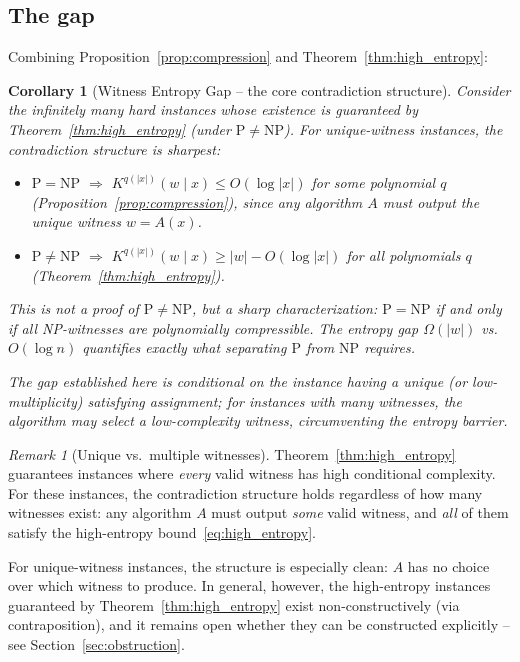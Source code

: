 \documentclass[aps,prd,twocolumn,superscriptaddress,nofootinbib]{revtex4-2}
\newtheorem{corollary}[theorem]{Corollary}
\theoremstyle{definition}
\theoremstyle{remark}
\newtheorem{remark}[theorem]{Remark}
\newcommand{\NP}{\mathrm{NP}}
\newcommand{\PP}{\mathrm{P}}
\begin{document}
\subsection{The gap}

Combining Proposition~\ref{prop:compression} and Theorem~\ref{thm:high_entropy}:

\begin{corollary}[Witness Entropy Gap -- the core contradiction structure]
\label{cor:gap}
Consider the infinitely many hard instances whose existence is guaranteed by Theorem~\ref{thm:high_entropy} (under $\PP \neq \NP$). For unique-witness instances, the contradiction structure is sharpest:
\begin{itemize}
\item $\PP = \NP$ $\Rightarrow$ $K^{q(|x|)}(w \mid x) \leq O(\log |x|)$ for some polynomial $q$ (Proposition~\ref{prop:compression}), since any algorithm $A$ must output the unique witness $w = A(x)$.
\item $\PP \neq \NP$ $\Rightarrow$ $K^{q(|x|)}(w \mid x) \geq |w| - O(\log |x|)$ for all polynomials $q$ (Theorem~\ref{thm:high_entropy}).
\end{itemize}
This is not a proof of $\PP \neq \NP$, but a sharp characterization: $\PP = \NP$ if and only if all NP-witnesses are polynomially compressible. The entropy gap $\Omega(|w|)$ vs.\ $O(\log n)$ quantifies exactly what separating $\PP$ from $\NP$ requires.

The gap established here is conditional on the instance having a unique (or low-multiplicity) satisfying assignment; for instances with many witnesses, the algorithm may select a low-complexity witness, circumventing the entropy barrier.
\end{corollary}

\begin{remark}[Unique vs.\ multiple witnesses]
Theorem~\ref{thm:high_entropy} guarantees instances where \textit{every} valid witness has high conditional complexity. For these instances, the contradiction structure holds regardless of how many witnesses exist: any algorithm $A$ must output \textit{some} valid witness, and \textit{all} of them satisfy the high-entropy bound~\eqref{eq:high_entropy}.

For unique-witness instances, the structure is especially clean: $A$ has no choice over which witness to produce. In general, however, the high-entropy instances guaranteed by Theorem~\ref{thm:high_entropy} exist non-constructively (via contraposition), and it remains open whether they can be constructed explicitly -- see Section~\ref{sec:obstruction}.
\end{remark}
\end{document}
